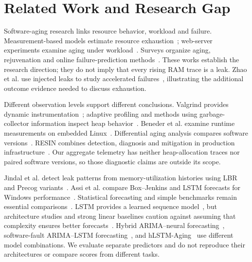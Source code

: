 \documentclass{llncs}
\begin{document}
\section{Related Work and Research Gap}
Software-aging research links resource behavior, workload and failure. Measurement-based models estimate resource exhaustion~\cite{ref8}; web-server experiments examine aging under workload~\cite{ref9}. Surveys organize aging, rejuvenation and online failure-prediction methods~\cite{ref10,ref22}. These works establish the research direction; they do not imply that every rising RAM trace is a leak. Zhao et al. use injected leaks to study accelerated failures~\cite{ref11}, illustrating the additional outcome evidence needed to discuss exhaustion.

Different observation levels support different conclusions. Valgrind provides dynamic instrumentation~\cite{ref12}; adaptive profiling and methods using garbage-collector information inspect heap behavior~\cite{ref14,ref17}. Beneder et al. examine runtime measurements on embedded Linux~\cite{ref19}. Differential aging analysis compares software versions~\cite{ref20}. RESIN combines detection, diagnosis and mitigation in production infrastructure~\cite{ref21}. Our aggregate telemetry has neither heap-allocation traces nor paired software versions, so those diagnostic claims are outside its scope.

Jindal et al. detect leak patterns from memory-utilization histories using LBR and Precog variants~\cite{ref1}. Assi et al. compare Box--Jenkins and LSTM forecasts for Windows performance~\cite{ref2}. Statistical forecasting and simple benchmarks remain essential comparisons~\cite{ref24,ref25}. LSTM provides a learned sequence model~\cite{ref26}, but architecture studies and strong linear baselines caution against assuming that complexity ensures better forecasts~\cite{ref28,ref32}. Hybrid ARIMA--neural forecasting~\cite{ref29}, software-fault ARIMA--LSTM forecasting~\cite{ref30}, and hLSTM-Aging~\cite{ref31} use different model combinations. We evaluate separate predictors and do not reproduce their architectures or compare scores from different tasks.
\end{document}
